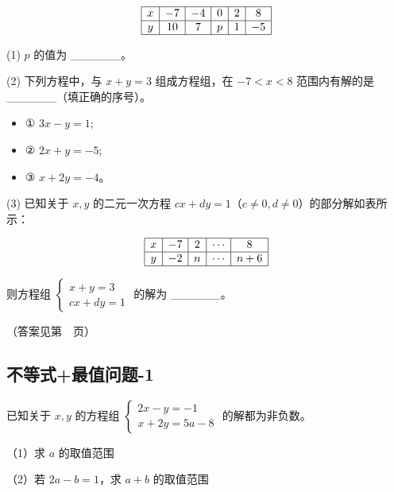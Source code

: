 \[
\begin{array}{|c|c|c|c|c|c|}
\hline
x & -7 & -4 & 0 & 2 & 8 \\
\hline
y & 10 & 7 & p & 1 & -5 \\
\hline
\end{array}
\]

(1) \(p\) 的值为 \_\_\_\_\_\_。

\vspace{3cm}

(2) 下列方程中，与 \(x+y=3\) 组成方程组，在 \(-7<x<8\) 范围内有解的是 \_\_\_\_\_\_（填正确的序号）。
\begin{itemize}
\item ① \(3x-y=1\);
\item ② \(2x+y=-5\);
\item ③ \(x+2y=-4\)。
\end{itemize}

\vspace{3cm}

(3) 已知关于 \(x, y\) 的二元一次方程 \(cx+dy=1\)（\(c \neq 0, d \neq 0\)）的部分解如表所示：

\[
\begin{array}{|c|c|c|c|c|}
\hline
x & -7 & 2 & \cdots & 8 \\
\hline
y & -2 & n & \cdots & n+6 \\
\hline
\end{array}
\]

则方程组 \(\begin{cases} x+y=3 \\ cx+dy=1 \end{cases}\) 的解为 \_\_\_\_\_\_。

\vspace{4cm}


（答案见第~\pageref{2025北京二中期末}~页）

\subsection{不等式+最值问题-1}

已知关于 \(x, y\) 的方程组 \(\begin{cases} 2x-y=-1 \\ x+2y=5a-8 \end{cases}\) 的解都为非负数。

（1）求 \(a\) 的取值范围  

\vspace{3cm}

（2）若 \(2a-b=1\)，求 \(a+b\) 的取值范围  
\vspace{3cm}

